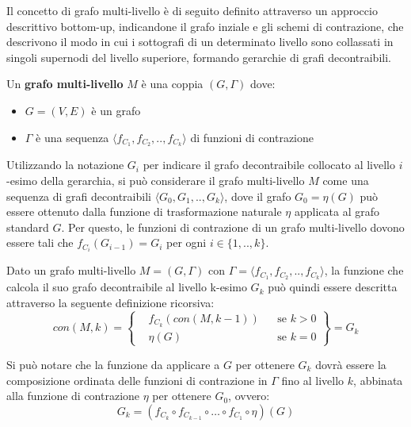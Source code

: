\label{subsec:definzione-grafi_multilivello}

Il concetto di grafo multi-livello \`e di seguito definito attraverso un approccio descrittivo bottom-up,
indicandone il grafo inziale e gli schemi di contrazione, che descrivono il modo in cui i sottografi di un
determinato livello sono collassati in singoli supernodi del livello superiore, formando gerarchie di grafi
decontraibili.

\begin{definition}
Un \textbf{grafo multi-livello} $M$ \`e una coppia $(G, \Gamma)$ dove:
    \begin{itemize}
        \item $G = (V, E)$ \`e un grafo
        \item $\Gamma$ \`e una sequenza $\langle f_{C_1}, f_{C_2}, .., f_{C_k} \rangle$ di funzioni di contrazione
    \end{itemize}
\end{definition}

Utilizzando la notazione $G_i$ per indicare il grafo decontraibile collocato al livello $i$-esimo della gerarchia,
si pu\`o considerare il grafo multi-livello $M$ come una sequenza di grafi decontraibili
$\langle G_0, G_1, .., G_k \rangle$, dove il grafo $G_0 = \eta(G)$ pu\`o essere ottenuto dalla funzione di
trasformazione naturale $\eta$ applicata al grafo standard $G$.
Per questo, le funzioni di contrazione di un grafo multi-livello dovono essere tali che
$f_{C_i}(G_{i-1}) = G_i$ per ogni $i \in \{1, .., k\}$. \newline

Dato un grafo multi-livello $M = (G,\Gamma)$ con $\Gamma = \langle f_{C_1}, f_{C_2}, .., f_{C_k} \rangle$,
la funzione che calcola il suo grafo decontraibile al livello k-esimo $G_k$ pu\`o quindi essere descritta
attraverso la seguente definizione ricorsiva: \newline
\begin{equation*}
    con(M, k) =
    \left\{
    \begin{aligned}
        &f_{C_k}(con(M, k-1)) && \text{se } k > 0\\
        &\eta(G)  && \text{se } k = 0
    \end{aligned}
    \right\}
    = G_k
\end{equation*} \newline

Si pu\`o notare che la funzione da applicare a $G$ per ottenere $G_{k}$ dovr\`a essere la composizione ordinata
delle funzioni di contrazione in $\Gamma$ fino al livello $k$, abbinata alla funzione di contrazione $\eta$ per
ottenere $G_0$, ovvero:
\begin{equation*}
    G_k = (f_{C_k} \circ f_{C_{k-1}} \circ \ldots \circ f_{C_1} \circ \eta)(G)
\end{equation*}

